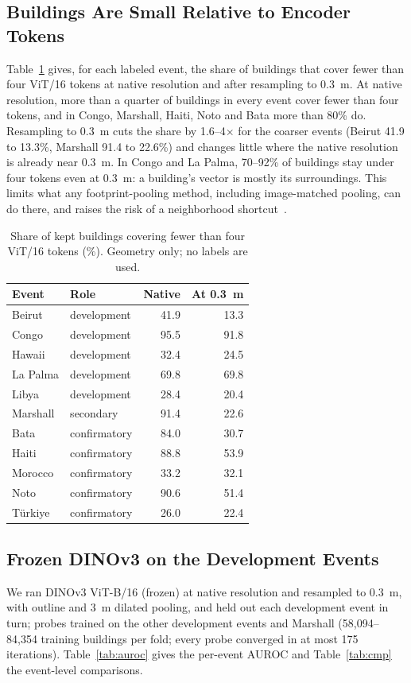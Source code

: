 \documentclass[journal]{IEEEtran}
\begin{document}
\subsection{Buildings Are Small Relative to Encoder Tokens}
\label{sec:res-size}
Table~\ref{tab:tokens} gives, for each labeled event, the share of buildings that cover fewer than four ViT/16 tokens at native resolution and after resampling to 0.3~m. At native resolution, more than a quarter of buildings in every event cover fewer than four tokens, and in Congo, Marshall, Haiti, Noto and Bata more than 80\% do. Resampling to 0.3~m cuts the share by 1.6--4$\times$ for the coarser events (Beirut 41.9 to 13.3\%, Marshall 91.4 to 22.6\%) and changes little where the native resolution is already near 0.3~m. In Congo and La Palma, 70--92\% of buildings stay under four tokens even at 0.3~m: a building's vector is mostly its surroundings. This limits what any footprint-pooling method, including image-matched pooling, can do there, and raises the risk of a neighborhood shortcut~\cite{geirhos2020shortcut}.

\begin{table}[t]
\centering
\caption{Share of kept buildings covering fewer than four ViT/16 tokens (\%). Geometry only; no labels are used.}
\label{tab:tokens}
\footnotesize
\begin{tabular}{@{}llrr@{}}
\toprule
Event & Role & Native & At 0.3~m \\
\midrule
Beirut & development & 41.9 & 13.3 \\
Congo & development & 95.5 & 91.8 \\
Hawaii & development & 32.4 & 24.5 \\
La Palma & development & 69.8 & 69.8 \\
Libya & development & 28.4 & 20.4 \\
Marshall & secondary & 91.4 & 22.6 \\
Bata & confirmatory & 84.0 & 30.7 \\
Haiti & confirmatory & 88.8 & 53.9 \\
Morocco & confirmatory & 33.2 & 32.1 \\
Noto & confirmatory & 90.6 & 51.4 \\
T\"urkiye & confirmatory & 26.0 & 22.4 \\
\bottomrule
\end{tabular}
\end{table}

\subsection{Frozen DINOv3 on the Development Events}
We ran DINOv3 ViT-B/16 (frozen) at native resolution and resampled to 0.3~m, with outline and 3~m dilated pooling, and held out each development event in turn; probes trained on the other development events and Marshall (58,094--84,354 training buildings per fold; every probe converged in at most 175 iterations). Table~\ref{tab:auroc} gives the per-event AUROC and Table~\ref{tab:cmp} the event-level comparisons.
\end{document}
